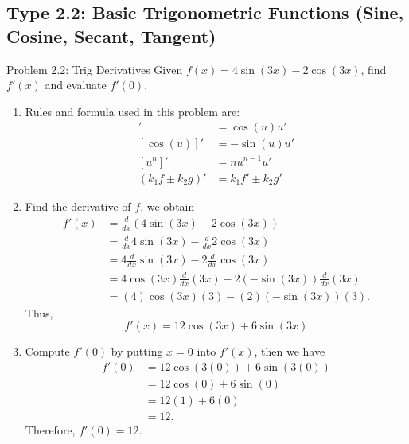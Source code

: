 \documentclass[11pt,a4paper]{article}
\begin{document}
\subsection{Type 2.2: Basic Trigonometric Functions (Sine, Cosine, Secant, Tangent)}
\begin{problembox}{Problem 2.2: Trig Derivatives}
Given $f(x) = 4\sin(3x) - 2\cos(3x)$, find $f'(x)$ and evaluate $f'(0)$.
\end{problembox}
\begin{solutionbox}
\begin{enumerate}
	\item [Step 1.] Rules and formula used in this problem are:
	\begin{align*}
		[\sin(u)]' &= \cos(u) u' \\
		[\cos(u)]' &= -\sin(u) u' \\
		[u^n]' &= n u^{n-1} u' \\
		(k_1f \pm k_2 g)' &= k_1f' \pm k_2g'
	\end{align*}
	
	\item [Step 2.] Find the derivative of $f$, we obtain
	\begin{align*}
		f'(x) &= \frac{d}{dx} \left(4\sin(3x) - 2\cos(3x)\right) \\
		&= \frac{d}{dx} 4\sin(3x) - \frac{d}{dx} 2\cos(3x) \\
		&= 4 \frac{d}{dx} \sin(3x) - 2 \frac{d}{dx} \cos(3x) \\
		&= 4\cos(3x)\frac{d}{dx}(3x) - 2(-\sin(3x))\frac{d}{dx}(3x) \\
		&= (4)\cos(3x)(3) - (2)(-\sin(3x))(3).
	\end{align*}
	Thus,
	\begin{equation*}
		f'(x) = 12\cos(3x) + 6\sin(3x)
	\end{equation*}
	
	\item [Step 3.] Compute $f'(0)$ by putting $x = 0$ into $f'(x)$, then we have
	\begin{align*}
		f'(0) &= 12\cos(3(0)) + 6\sin(3(0)) \\
		&= 12\cos(0) + 6\sin(0) \\
		&= 12(1) + 6(0) \\
		&= 12.
	\end{align*}
	Therefore, $f'(0) = 12$.
	\end{enumerate}
\end{solutionbox}
\end{document}
